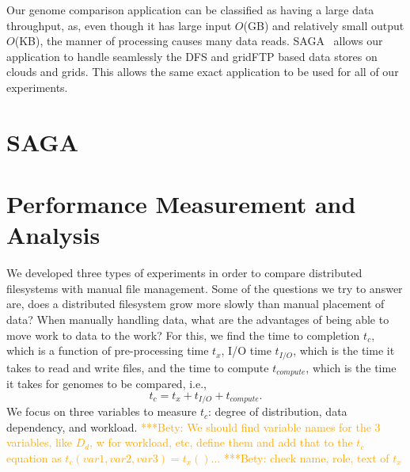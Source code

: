 \documentclass{rspublic}
\newcommand{\micnote}[1]{ {\textcolor{blue} { ***Michael: #1 }}}
\newcommand{\betynote}[1]{ {\textcolor{orange} { ***Bety: #1 }}}
\newcommand{\jhanote}[1]{} \newcommand{\micnote}[1]{}\newcommand{\betynote}[1]{} \newcommand{\fixme}[1]{}
\begin{document}

Our genome comparison application can be classified as having a large
data throughput, as, even though it has large input $O$(GB) and
relatively small output $O$(KB), the manner of processing causes many
data reads.  SAGA~\citep{saga_web} allows our application to handle
seamlessly the DFS and gridFTP based data stores on clouds and grids.
This allows the same exact application to be used for all of our
experiments.  

\section{SAGA} \label{Sec:SAGA}

\section{Performance Measurement and Analysis} We developed three types
of experiments in order to compare distributed filesystems with manual
file management. Some of the questions we try to answer are, does a
distributed filesystem grow more slowly than manual placement of data?
When manually handling data, what are the advantages of being able to
move work to data to the work? For this, we find the time to completion
$t_c$, which is a function of pre-processing time $t_x$, I/O time
$t_{I/O}$, which is the time it takes to read and write files, and the
time to compute $t_{compute}$, which is the time it takes for genomes to
be compared, i.e.,
 \begin{equation}
t_c = t_x + t_{I/O} + t_{compute}.
\end{equation}
We focus on three variables to measure $t_c$:  degree of distribution, data
dependency, and workload.
\betynote{We should find variable names for the 3 variables, like $D_d$,
w for workload, etc, define them and add that to the $t_c$ equation as
$t_c(var1, var2, var3) = t_x()$...}
\betynote{check name, role, text of $t_x$}
\end{document}
